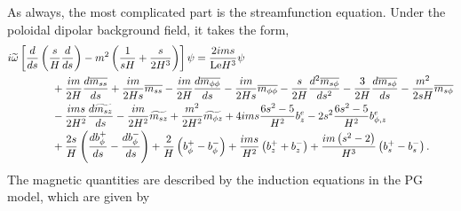 As always, the most complicated part is the streamfunction equation. Under the poloidal dipolar background field, it takes the form,
\begin{equation}
\begin{aligned}\label{eqn:eigen-pgpsi-poloidal-dipole}
    i\widetilde{\omega} \left[\frac{d}{d s}\left(\frac{s}{H}\frac{d}{d s}\right) - m^2 \left(\frac{1}{sH} + \frac{s}{2H^3}\right)\right] \psi &= \frac{2 i m s}{\mathrm{Le} H^{3}} \psi \\
    &\mkern-240mu + \frac{i m}{2 H} \frac{d\overline{m_{ss}}}{d s} + \frac{i m}{2 H s} \overline{m_{ss}} - \frac{i m}{2 H} \frac{d \overline{m_{\phi\phi}}}{d s} - \frac{i m}{2 H s} \overline{m_{\phi\phi}} - \frac{s}{2 H} \frac{d^{2}\overline{m_{s\phi}}}{d s^{2}} - \frac{3}{2 H} \frac{d\overline{m_{s\phi}}}{d s} - \frac{m^{2}}{2 sH} \overline{m_{s\phi}} \\
    &\mkern-240mu - \frac{i m s}{2 H^{2}} \frac{d\widetilde{m_{sz}}}{d s} - \frac{i m}{2 H^{2}}\widetilde{m_{sz}} + \frac{m^{2}}{2 H^{2}} \widetilde{m_{\phi z}} + 4 i ms\frac{6 s^{2} - 5}{H^{2}} b_{z}^e - 2s^2\frac{6 s^{2} - 5}{H^{2}} b_{\phi, z}^e \\
    &\mkern-240mu + \frac{2 s}{H} \left(\frac{db^{+}_{\phi}}{d s} - \frac{db^{-}_{\phi}}{d s}\right) + \frac{2}{H} \left(b^{+}_{\phi} - b^{-}_{\phi}\right) + \frac{i m s}{H^{2}} \left(b^{+}_{z} + b^{-}_{z}\right) + \frac{i m \left(s^2 - 2\right)}{H^{3}} \left(b^{+}_{s} - b^{-}_{s}\right).
\end{aligned}
\end{equation}
The magnetic quantities are described by the induction equations in the PG model, which are given by

